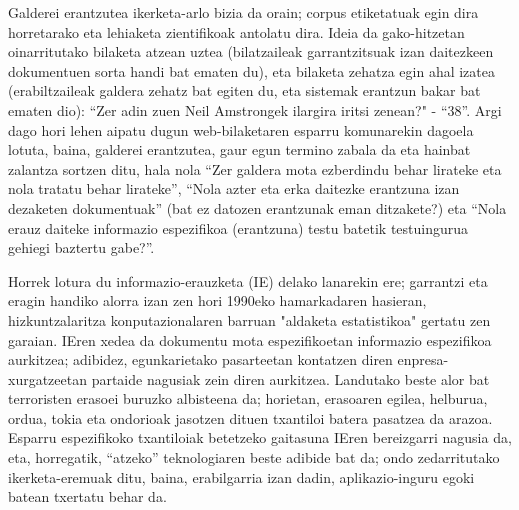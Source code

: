 \begin{multicols}{2}
Galderei erantzutea ikerketa-arlo bizia da orain; corpus etiketatuak egin dira horretarako eta lehiaketa zientifikoak antolatu dira. Ideia da gako-hitzetan oinarritutako bilaketa atzean uztea (bilatzaileak garrantzitsuak izan daitezkeen dokumentuen sorta handi bat ematen du), eta bilaketa zehatza egin ahal izatea (erabiltzaileak galdera zehatz bat egiten du, eta sistemak erantzun bakar bat ematen dio): “Zer adin zuen Neil Amstrongek ilargira iritsi zenean?" - “38”. Argi dago hori lehen aipatu dugun web-bilaketaren esparru komunarekin dagoela lotuta, baina, galderei erantzutea, gaur egun termino zabala da eta hainbat zalantza sortzen ditu, hala nola “Zer galdera mota ezberdindu behar lirateke eta nola tratatu behar lirateke”, “Nola azter eta erka daitezke erantzuna izan dezaketen dokumentuak” (bat ez datozen erantzunak eman ditzakete?) eta “Nola erauz daiteke informazio espezifikoa (erantzuna) testu batetik testuingurua gehiegi baztertu gabe?”. 

Horrek lotura du informazio-erauzketa (IE) delako lanarekin ere; garrantzi eta eragin handiko alorra izan zen hori 1990eko hamarkadaren hasieran, hizkuntzalaritza konputazionalaren barruan "aldaketa estatistikoa" gertatu zen garaian. IEren xedea da dokumentu mota espezifikoetan informazio espezifikoa aurkitzea; adibidez, egunkarietako pasarteetan kontatzen diren enpresa-xurgatzeetan partaide nagusiak zein diren aurkitzea. Landutako beste alor bat terroristen erasoei buruzko albisteena da; horietan, erasoaren egilea, helburua, ordua, tokia eta ondorioak jasotzen dituen txantiloi batera pasatzea da arazoa. Esparru espezifikoko txantiloiak betetzeko gaitasuna IEren bereizgarri nagusia da, eta, horregatik, “atzeko” teknologiaren beste adibide bat da; ondo zedarritutako ikerketa-eremuak ditu, baina, erabilgarria izan dadin, aplikazio-inguru egoki batean txertatu behar da. 



\end{multicols}

